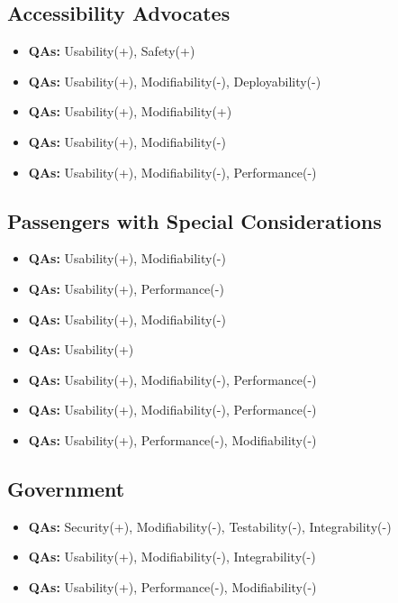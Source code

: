 \subsection{Accessibility Advocates}
\begin{itemize}
    \item \userStorySix \textbf{QAs:} Usability(+), Safety(+)
    \item \userStorySeven \textbf{QAs:} Usability(+), Modifiability(-), Deployability(-)
    \item \userStoryEight \textbf{QAs:} Usability(+), Modifiability(+)
    \item \userStoryNine \textbf{QAs:} Usability(+), Modifiability(-)
    \item \userStoryTen \textbf{QAs:} Usability(+), Modifiability(-), Performance(-)
\end{itemize}

\subsection{Passengers with Special Considerations}
\begin{itemize}
    \item \userStoryEleven \textbf{QAs:} Usability(+), Modifiability(-)
    \item \userStoryTwelve \textbf{QAs:} Usability(+), Performance(-)
    \item \userStoryThirteen \textbf{QAs:} Usability(+), Modifiability(-)
    \item \userStoryFourteen \textbf{QAs:} Usability(+)
    \item \userStoryFifteen \textbf{QAs:} Usability(+), Modifiability(-), Performance(-)
    \item \userStorySixteen \textbf{QAs:} Usability(+), Modifiability(-), Performance(-)
    \item \userStorySeventeen \textbf{QAs:} Usability(+), Performance(-), Modifiability(-)
\end{itemize}

\subsection{Government}
\begin{itemize}
    \item \userStoryEighteen \textbf{QAs:} Security(+), Modifiability(-), Testability(-), Integrability(-)
    \item \userStoryNineteen \textbf{QAs:} Usability(+), Modifiability(-), Integrability(-)
    \item \userStoryTwenty \textbf{QAs:} Usability(+), Performance(-), Modifiability(-)
\end{itemize}


